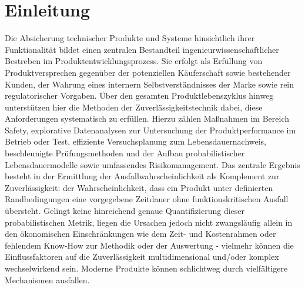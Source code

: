 
\chapter{Einleitung}
Die Absicherung technischer Produkte und Systeme hinsichtlich ihrer Funktionalität bildet einen zentralen Bestandteil ingenieurwissenschaftlicher Bestreben im Produktentwicklungsprozess.
Sie erfolgt als Erfüllung von Produktversprechen gegenüber der potenziellen Käuferschaft sowie bestehender Kunden, der Wahrung eines internern Selbstverständnisses der Marke sowie rein regulatorischer Vorgaben.
Über den gesamten Produktlebenszyklus hinweg unterstützen hier die Methoden der Zuverlässigkeitstechnik dabei, diese Anforderungen systematisch zu erfüllen.
Hierzu zählen Maßnahmen im Bereich Safety, explorative Datenanalysen zur Untersuchung der Produktperformance im Betrieb oder Test, effiziente Versuchsplanung zum Lebensdauernachweis, beschleunigte Prüfungsmethoden und der Aufbau probabilistischer Lebensdauermodelle sowie umfassendes Risikomanagement.
Das zentrale Ergebnis besteht in der Ermittlung der Ausfallwahrscheinlichkeit als Komplement zur Zuverlässigkeit: der Wahrscheinlichkeit, dass ein Produkt unter definierten Randbedingungen eine vorgegebene Zeitdauer ohne funktionskritischen Ausfall übersteht.
Gelingt keine hinreichend genaue Quantifizierung dieser probabilistischen Metrik, liegen die Ursachen jedoch nicht zwangsläufig allein in den ökonomischen Einschränkungen wie dem Zeit- und Kostenrahmen oder fehlendem Know-How zur Methodik oder der Auswertung - vielmehr können die Einflussfaktoren auf die Zuverlässigkeit multidimensional und/oder komplex wechselwirkend sein.
Moderne Produkte können schlichtweg durch vielfältigere Mechanismen ausfallen.


